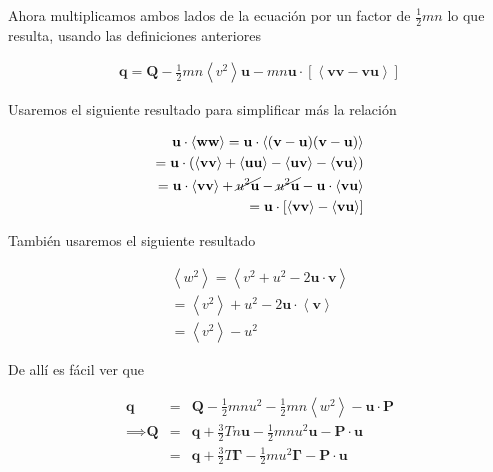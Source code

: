 \documentclass[11pt]{article}
\theoremstyle{definition}
\begin{document}
  Ahora multiplicamos ambos lados de la ecuaci\'on por un factor de $\frac{1}{2}mn$ lo que resulta, usando las definiciones anteriores 
  
  \begin{eqnarray*}
    \textbf{q} = \textbf{Q} - \frac{1}{2}mn\left<v^2\right>\textbf{u} - mn\textbf{u}\cdot[\left<\textbf{vv} - \textbf{vu}\right>]
  \end{eqnarray*}


  \begin{shaded}
  
    Usaremos el siguiente resultado para simplificar m\'as la relaci\'on
    
    \begin{eqnarray*}
      \textbf{u}\cdot\left<\textbf{ww}\right> = \textbf{u}\cdot\left<(\textbf{v} - \textbf{u})(\textbf{v} - \textbf{u})\right>\\
      = \textbf{u}\cdot(\left<\textbf{vv}\right> + \left<\textbf{uu}\right> - \left<\textbf{uv}\right> - \left<\textbf{vu}\right>) \\
      = \textbf{u}\cdot\left<\textbf{vv}\right> + \cancel{u^2\textbf{u}} - \cancel{u^2\textbf{u}} - \textbf{u}\cdot\left<\textbf{vu}\right>\\
      = \textbf{u}\cdot[\left<\textbf{vv}\right> - \left<\textbf{vu}\right>]
    \end{eqnarray*}

    Tambi\'en usaremos el siguiente resultado

    \begin{eqnarray*}
      \left<w^2\right> = \left<v^2 + u^2 - 2\textbf{u}\cdot\textbf{v}\right>\\
      = \left<v^2\right> + u^2 - 2\textbf{u}\cdot\left<\textbf{v}\right>\\
      = \left<v^2\right> - u^2
    \end{eqnarray*}
  \end{shaded}

  De all\'i es f\'acil ver que 

  \begin{eqnarray}
    \textbf{q} &=& \textbf{Q} -\frac{1}{2}mnu^2 - \frac{1}{2}mn\left<w^2\right> - \textbf{u}\cdot\textbf{P}\nonumber\\
    \implies \textbf{Q} &=& \textbf{q} + \frac{3}{2}Tn\textbf{u} - \frac{1}{2}mnu^2\textbf{u} - \textbf{P}\cdot\textbf{u}\nonumber \\
                        &=& \textbf{q} + \frac{3}{2}T\pmb{\Gamma} - \frac{1}{2}mu^2\pmb{\Gamma} - \textbf{P}\cdot\textbf{u}
  \end{eqnarray}
\end{document}
